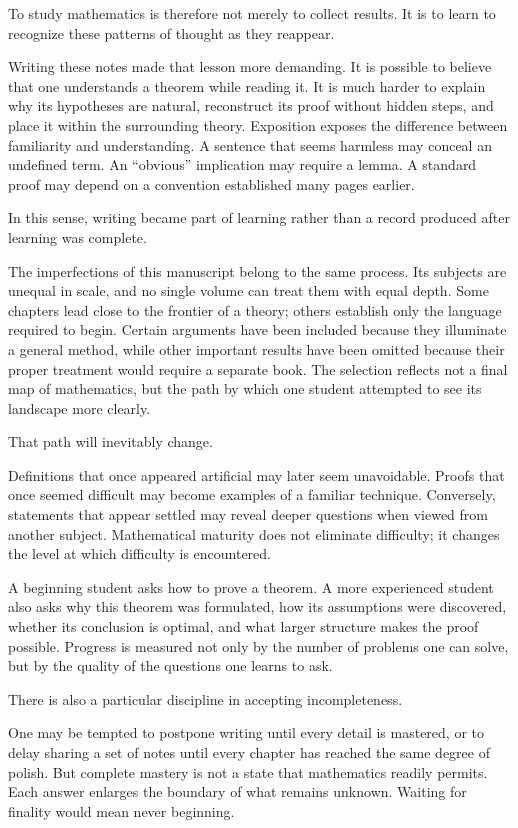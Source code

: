 To study mathematics is therefore not merely to collect results. It is to learn to recognize these patterns of thought as they reappear.

Writing these notes made that lesson more demanding. It is possible to believe that one understands a theorem while reading it. It is much harder to explain why its hypotheses are natural, reconstruct its proof without hidden steps, and place it within the surrounding theory. Exposition exposes the difference between familiarity and understanding. A sentence that seems harmless may conceal an undefined term. An ``obvious'' implication may require a lemma. A standard proof may depend on a convention established many pages earlier.

In this sense, writing became part of learning rather than a record produced after learning was complete.

The imperfections of this manuscript belong to the same process. Its subjects are unequal in scale, and no single volume can treat them with equal depth. Some chapters lead close to the frontier of a theory; others establish only the language required to begin. Certain arguments have been included because they illuminate a general method, while other important results have been omitted because their proper treatment would require a separate book. The selection reflects not a final map of mathematics, but the path by which one student attempted to see its landscape more clearly.

That path will inevitably change.

Definitions that once appeared artificial may later seem unavoidable. Proofs that once seemed difficult may become examples of a familiar technique. Conversely, statements that appear settled may reveal deeper questions when viewed from another subject. Mathematical maturity does not eliminate difficulty; it changes the level at which difficulty is encountered.

A beginning student asks how to prove a theorem. A more experienced student also asks why this theorem was formulated, how its assumptions were discovered, whether its conclusion is optimal, and what larger structure makes the proof possible. Progress is measured not only by the number of problems one can solve, but by the quality of the questions one learns to ask.

There is also a particular discipline in accepting incompleteness.

One may be tempted to postpone writing until every detail is mastered, or to delay sharing a set of notes until every chapter has reached the same degree of polish. But complete mastery is not a state that mathematics readily permits. Each answer enlarges the boundary of what remains unknown. Waiting for finality would mean never beginning.

